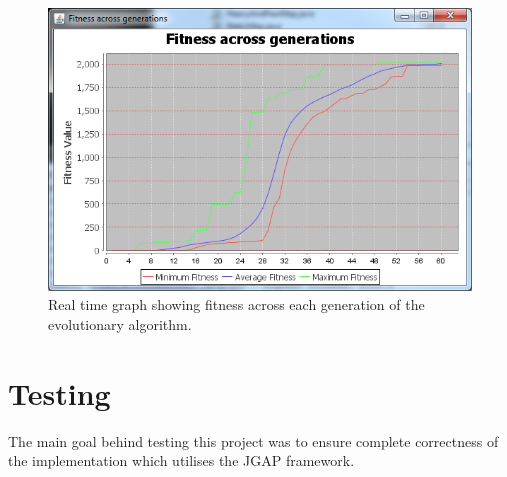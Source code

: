 \documentclass[12pt]{article}
\begin{document}
\begin{figure} [ht]
\centering
\includegraphics[scale = 0.75]{nicegraph.png}
\caption{Real time graph showing fitness across each generation of the evolutionary algorithm.}
\label{fig:nicegraph}
\end{figure}








\section{Testing}
The main goal behind testing this project was to ensure complete correctness of the implementation which utilises the JGAP framework.
\end{document}
